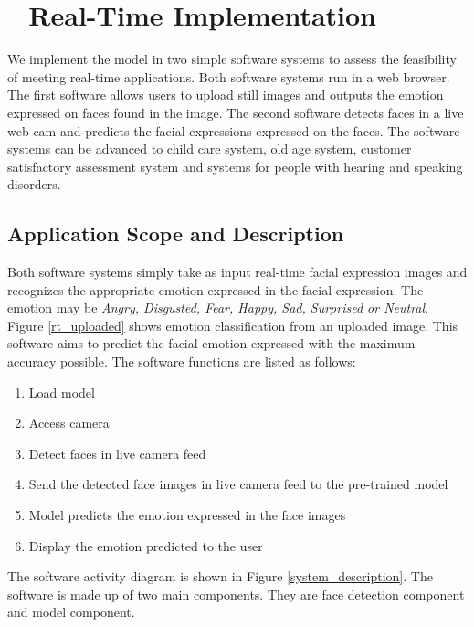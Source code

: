 \documentclass[master]{thesis-uestc}
\begin{document}
\chapter{\,\,\,\,\,\textbf{Real-Time Implementation}}
We implement the model in two simple software systems to assess the feasibility of meeting real-time applications. Both software systems run in a web browser. The first software allows users to upload still images and outputs the emotion expressed on faces found in the image. The second software detects faces in a live web cam and predicts the facial expressions expressed on the faces. The software systems can be advanced to child care system, old age system, customer satisfactory assessment system and systems for people with hearing and speaking disorders.

\section{Application Scope and Description}
Both software systems simply take as input real-time facial expression images and recognizes the appropriate emotion expressed in the facial expression. The emotion may be \textit{Angry, Disgusted, Fear, Happy, Sad,
Surprised or Neutral}. Figure \ref{rt_uploaded} shows emotion classification from an uploaded image. This software aims to predict the facial emotion expressed with the maximum accuracy possible. The software functions are listed as follows:
\begin{enumerate}
    \item Load model
    \item Access camera
    \item Detect faces in live camera feed
    \item Send the detected face images in live camera feed to the pre-trained model
    \item Model predicts the emotion expressed in the face images
    \item Display the emotion predicted to the user
\end{enumerate}
The software activity diagram is shown in Figure \ref{system_description}. The software is made up of two main components. They are face detection component and model component.
\end{document}
